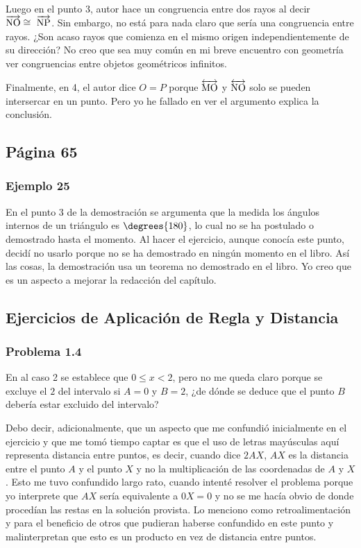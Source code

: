 Luego en el punto 3, autor hace un congruencia entre dos rayos al decir \(\overrightarrow{\rm NO} \cong\ \overrightarrow{\rm NP}\). Sin embargo, no está para nada claro que sería una congruencia entre rayos. ¿Son acaso rayos que comienza en el mismo origen independientemente de su dirección? No creo que sea muy común en mi breve encuentro con geometría ver congruencias entre objetos geométricos infinitos. 

Finalmente, en 4, el autor dice \(O=P\) porque \(\overleftrightarrow{\rm MO}\) y \(\overleftrightarrow{\rm NO}\) solo se pueden intersercar en un punto. Pero yo he fallado en ver el argumento explica la conclusión.

\subsection{Página 65}
\subsubsection{Ejemplo 25}

En el punto 3 de la demostración se argumenta que la medida los ángulos internos de un triángulo es \(\degrees{180}\), lo cual no se ha postulado o demostrado hasta el momento. Al hacer el ejercicio, aunque conocía este punto, decidí no usarlo porque no se ha demostrado en ningún momento en el libro. Así las cosas, la demostración usa un teorema no demostrado en el libro. Yo creo que es un aspecto a mejorar la redacción del capítulo.

\subsection{Ejercicios de Aplicación de Regla y Distancia}
\subsubsection{Problema 1.4}

En al caso 2 se establece que $0 \leq x < 2$, pero no me queda claro porque se excluye el $2$ del intervalo si $A=0$ y $B=2$, ¿de dónde se deduce que el punto $B$ debería estar excluido del intervalo?

Debo decir, adicionalmente, que un aspecto que me confundió inicialmente en el ejercicio y que me tomó tiempo captar es que el uso de letras mayúsculas aquí representa distancia entre puntos, es decir, cuando dice $2AX$, $AX$ es la distancia entre el punto $A$ y el punto $X$ y no la multiplicación de las coordenadas de $A$ y $X$. Esto me tuvo confundido largo rato, cuando intenté resolver el problema porque yo interprete que $AX$ sería equivalente a $0X = 0$ y no se me hacía obvio de donde procedían las restas en la solución provista. Lo menciono como retroalimentación y para el beneficio de otros que pudieran haberse confundido en este punto y malinterpretan que esto es un producto en vez de distancia entre puntos.

